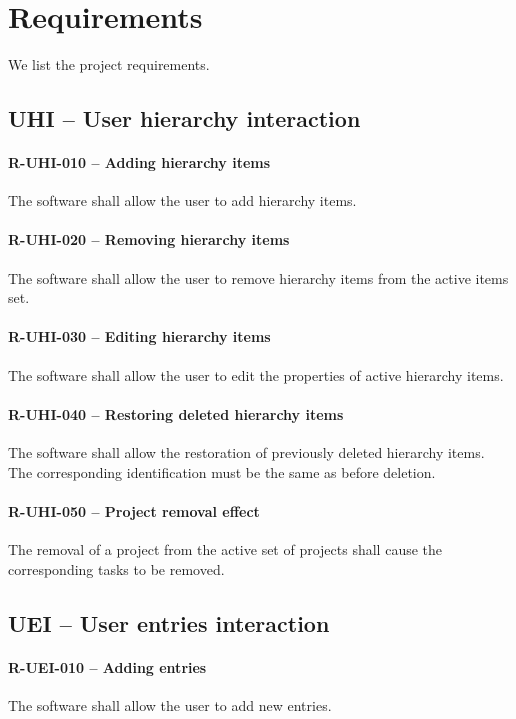 \section{Requirements}
We list the project requirements.

\subsection{UHI -- User hierarchy interaction}
\paragraph{R-UHI-010 -- Adding hierarchy items}
The software shall allow the user to add hierarchy items.

\paragraph{R-UHI-020 -- Removing hierarchy items}
The software shall allow the user to remove hierarchy items
from the active items set.

\paragraph{R-UHI-030 -- Editing hierarchy items}
The software shall allow the user to edit the properties of
active hierarchy items.

\paragraph{R-UHI-040 -- Restoring deleted hierarchy items}
The software shall allow the restoration of previously deleted
hierarchy items. The corresponding identification must be the same as before
deletion.

\paragraph{R-UHI-050 -- Project removal effect}
The removal of a project from the active set of projects shall cause
the corresponding tasks to be removed.

\subsection{UEI -- User entries interaction}
\paragraph{R-UEI-010 -- Adding entries}
The software shall allow the user to add new entries.

